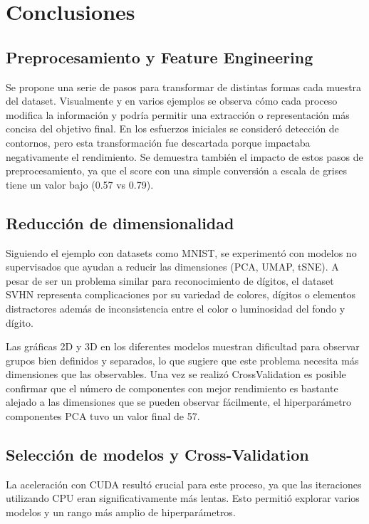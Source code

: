 \documentclass[journal]{IEEEtran}
\begin{document}
\section{Conclusiones}

\subsection{Preprocesamiento y Feature Engineering}
Se propone una serie de pasos para transformar de distintas formas cada muestra del dataset. Visualmente y en varios ejemplos se observa cómo cada proceso modifica la información y podría permitir una extracción o representación más concisa del objetivo final. En los esfuerzos iniciales se consideró detección de contornos, pero esta transformación fue descartada porque impactaba negativamente el rendimiento. Se demuestra también el impacto de estos pasos de preprocesamiento, ya que el score con una simple conversión a escala de grises tiene un valor bajo (0.57 vs 0.79).

\subsection{Reducción de dimensionalidad}
Siguiendo el ejemplo con datasets como MNIST, se experimentó con modelos no supervisados que ayudan a reducir las dimensiones (PCA, UMAP, tSNE). A pesar de ser un problema similar para reconocimiento de dígitos, el dataset SVHN representa complicaciones por su variedad de colores, dígitos o elementos distractores además de inconsistencia entre el color o luminosidad del fondo y dígito.

Las gráficas 2D y 3D en los diferentes modelos muestran dificultad para observar grupos bien definidos y separados, lo que sugiere que este problema necesita más dimensiones que las observables. Una vez se realizó CrossValidation es posible confirmar que el número de componentes con mejor rendimiento es bastante alejado a las dimensiones que se pueden observar fácilmente, el hiperparámetro componentes PCA tuvo un valor final de 57.

\subsection{Selección de modelos y Cross-Validation}
La aceleración con CUDA resultó crucial para este proceso, ya que las iteraciones utilizando CPU eran significativamente más lentas. Esto permitió explorar varios modelos y un rango más amplio de hiperparámetros.
\end{document}
